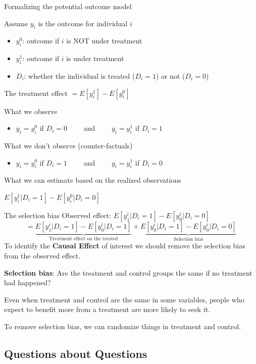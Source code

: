 \documentclass[handout]{beamer}
\begin{document}
\begin{frame}{Formalizing the potential outcome model}

Assume $y_i$ is the outcome for individual $i$
\begin{itemize}
	\item $y_i^0$: outcome if $i$ is NOT under treatment
	\item $y_i^1$: outcome if $i$ is under treatment
	\item $D_i$: whether the individual is treated ($D_i=1$) or not ($D_i=0$)
\end{itemize}\medskip\pause
The treatment effect $=E[y_i^{1}]-E[y_i^{0}]$\medskip

What we observe
\begin{itemize}
	\item $y_i=y_i^{0}$ if $D_i=0\qquad$  and $\qquad y_i=y_i^{1}$ if $D_i=1$
\end{itemize}\medskip\pause

What we don't observe (counter-factuals)
\begin{itemize}
	\item $y_i=y_i^0$ if $D_i=1\qquad$ and $\qquad y_i=y_i^1$ if $D_i=0$
\end{itemize}\medskip\pause

What we can estimate based on the realized observations

$E[y_i^1|D_i=1]-E[y_i^0|D_i=0]$
\end{frame}




\begin{frame}{The selection bias}
Observed effect: $E[y_{1}^i|D_i=1]-E[y_{0}^i|D_i=0]$
\[=\underbrace{E[y_{1}^i|D_i=1]-E[y_{0}^i|D_i=1]}_{\text{Treatment effect on the treated}}+\underbrace{E[y_{0}^i|D_i=1]-E[y_{0}^i|D_i=0]}_{\text{Selection bias}} \]
To identify the \textbf{Causal Effect} of interest we should remove the selection bias from the observed effect.\medskip

\textbf{Selection bias}: Are the treatment and control groups the same if no treatment had happened?\medskip

Even when treatment and control are the same in some variables, people who expect to benefit more from a treatment are more likely to seek it.\medskip

To remove selection bias, we can randomize things in treatment and control.


\end{frame}

\subsection{Questions about Questions}
\end{document}
